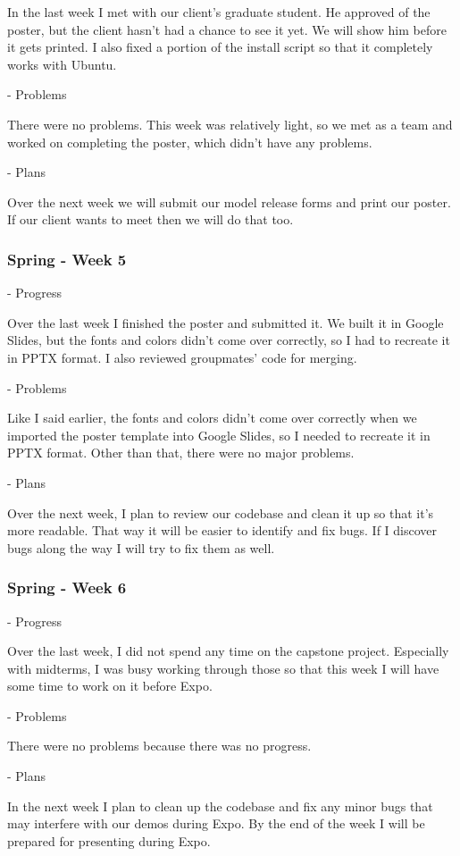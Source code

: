 \documentclass[onecolumn, draftclsnofoot,10pt, compsoc]{IEEEtran}
\begin{document}
In the last week I met with our client's graduate student.
He approved of the poster, but the client hasn't had a chance to see it yet.
We will show him before it gets printed.
I also fixed a portion of the install script so that it completely works with Ubuntu.

- Problems

There were no problems.
This week was relatively light, so we met as a team and worked on completing the poster, which didn't have any problems.

- Plans

Over the next week we will submit our model release forms and print our poster.
If our client wants to meet then we will do that too.
\subsubsection{Spring - Week 5}
- Progress

Over the last week I finished the poster and submitted it.
We built it in Google Slides, but the fonts and colors didn't come over correctly, so I had to recreate it in PPTX format.
I also reviewed groupmates' code for merging.

- Problems

Like I said earlier, the fonts and colors didn't come over correctly when we imported the poster template into Google Slides, so I needed to recreate it in PPTX format.
Other than that, there were no major problems.

- Plans

Over the next week, I plan to review our codebase and clean it up so that it's more readable.
That way it will be easier to identify and fix bugs.
If I discover bugs along the way I will try to fix them as well.
\subsubsection{Spring - Week 6}
- Progress

Over the last week, I did not spend any time on the capstone project.
Especially with midterms, I was busy working through those so that this week I will have some time to work on it before Expo.

- Problems

There were no problems because there was no progress.

- Plans

In the next week I plan to clean up the codebase and fix any minor bugs that may interfere with our demos during Expo.
By the end of the week I will be prepared for presenting during Expo.

\end{document}
